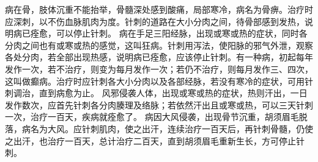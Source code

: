 \documentclass[a4paper,12pt,UTF8,twoside]{ctexbook}
\begin{document}
病在骨，肢体沉重不能抬举，骨髓深处感到酸痛，局部寒冷，病名为骨痹。治疗时应深刺，以不伤血脉肌肉为度。针刺的道路在大小分肉之间，待骨部感到发热，说明病已痊愈，可以停止针刺。
病在手足三阳经脉，出现或寒或热的症状，同时各分肉之间也有或寒或热的感觉，这叫狂病。针刺用泻法，使阳脉的邪气外泄，观察各处分肉，若全部出现热感，说明病已痊愈，应该停止针刺。有一种病，初起每年发作一次，若不治疗，则变为每月发作一次；若仍不治疗，则每月发作三、四次，这叫做癫病。治疗时应针刺各大小分肉以及各部经脉，若没有寒冷的症状，可用针刺调治，直到病愈为止。
风邪侵袭人体，出现或寒或热的症状，热则汗出，一日发作数次，应首先针刺各分肉腠理及络脉；若依然汗出且或寒或热，可以三天针刺一次，治疗一百天，疾病就痊愈了。
病因大风侵袭，出现骨节沉重，胡须眉毛脱落，病名为大风。应针刺肌肉，使之出汗，连续治疗一百天后，再针刺骨髓，仍使之出汗，也治疗一百天，总计治疗二百天，直到胡须眉毛重新生长，方可停止针刺。

\part{}
\end{document}
